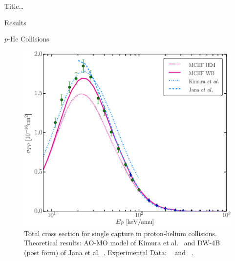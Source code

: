 \documentclass[letterpaper, 11 pt]{report}
\begin{document}
\begin{chapter}{ Title\dots \label{chap:p-he2p-he}}
\begin{section}{Results \label{sec:phe2p-res}}
\begin{subsection}{\texorpdfstring{$p$}{p}-He Collisions \label{sec:phe-res}}
\begin{figure}[ht]
\begin{minipage}{.49\linewidth}
               \centering
               \includegraphics[width = \linewidth]{./images/phe/phe-TP.eps}
               \caption[Total cross section for single capture in proton-helium collisions.]
                       {Total cross section for single capture in proton-helium collisions.
                        Theoretical results: AO-MO model of Kimura et al.~\cite{KL-86} and
                        DW-4B (post form) of Jana et al.~\cite{JMP-15}. Experimental Data:
                        {\color{OliveGreen}{$\bullet$}}~\cite{SG89} and
                        {\color{blue}{$\blacklozenge$}}~\cite{SG85}. \label{fig:phe-tp}}
            \end{minipage} \hspace{0.04\linewidth} %
            \begin{minipage}{.49\linewidth}


\end{minipage}
\end{figure}
\end{subsection}
\end{section}
\end{chapter}
\end{document}
